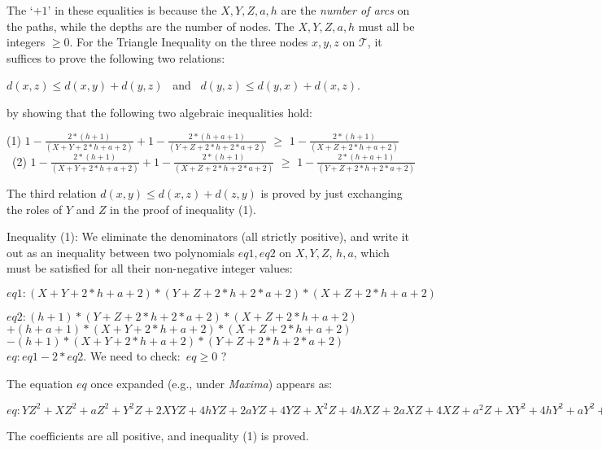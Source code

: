 \documentclass[pdflatex]{article}
\def \T {{\mathcal{T}}}
\def \lft {\noindent}
\newcommand{\disp}[1]{\vspace*{-1em}
    \begin{center} {#1} \end{center} \vspace*{-1mm} }
\begin{document}
  \lft
 The `$+1$' in these equalities is because the $X, Y, Z, a, h$ are the {\em number of 
 arcs} on the paths,  while the depths are the number of nodes. The $X, Y, Z, a, h$ must
 all be  integers $\ge 0$. For the Triangle Inequality on  the three nodes $x, y, z$ on $\T$,
 it suffices to prove the following two relations:
 \disp{$d(x, z) \le d(x, y) + d(y, z)$ \, and \,  $d(y, z) \le d(y, x) + d(x, z)$.}

 \lft by showing that the following two algebraic inequalities hold:

\vspace*{1mm} 
\disp{\!(1) $1 - \frac{ 2*(h+1) }{ (X+Y+2*h+a+2) } + 1 - \frac{ 2*(h+a+1) }{ (Y+Z+2*h+2*a+2) }$
  $\ge$     $1 - \frac{  2*(h+1) }{ (X+Z+2*h+a+2) }   $ \\ \vspace*{1mm}
   \, (2) $1 - \frac{ 2*(h+1) }{ (X+Y+2*h+a+2) } + 1 - \frac{ 2*(h+1) }{ (X+Z+2*h+2*a+2) }$
   $\ge$     $1 - \frac{  2*(h+a+1) }{ (Y+Z+2*h+2*a+2) }   $}

 \lft The third  relation $d(x, y) \le  d(x, z) + d(z, y)$ is proved by just
exchanging the roles of $Y$ and $Z$ in the proof  of inequality (1).


\lft Inequality (1): We eliminate  the denominators (all  strictly positive), and  write
 it out as an inequality between two polynomials  $eq1, eq2$ on $X,Y,Z$, $h,a$, which
 must be satisfied for all their non-negative integer values:
 
\vspace*{1mm}
\lft $ eq1: (X+Y+2*h+a+2)*(Y+Z+2*h+2*a+2)*(X+Z+2*h+a+2)$ \par
\lft $ eq2:  (h+1)*(Y+Z+2*h+2*a+2)*(X+Z+2*h+a+2) $ \\ \hspace*{1.5cm}
                    $ +(h+a+1)*(X+Y+2*h+a+2)*(X+Z+2*h+a+2)$ \\ \hspace*{1.5cm}
                    $ - (h+1)*(X+Y+2*h+a+2)*(Y+Z+2*h+2*a+2)$  \\ 
$eq: eq1 - 2*eq2$.  \; We need to check:\, $eq \ge 0$ ? 

\vspace*{1mm}\lft
The equation $eq$ once expanded  (e.g., under {\em Maxima})  appears as:

\vspace*{1mm}
\disp{
$eq: YZ^2+XZ^2+aZ^2+Y^2Z+2XYZ+4hYZ+2aYZ+4YZ+X^2Z+4hXZ+2aXZ+4XZ+a^2Z+XY^2
               +4hY^2+aY^2+4Y^2+X^2Y+4hXY+2aXY+4XY+8h^2Y+8ahY+16hY+a^2Y+8aY+8Y$}
\lft
The coefficients are all positive, and inequality (1)  is proved. 
\end{document}
